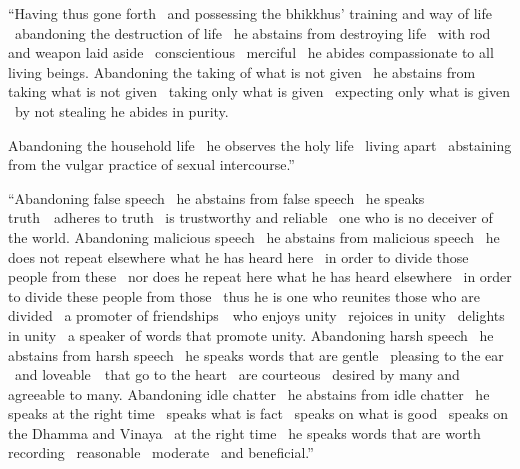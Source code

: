 \suttaRef{[MN 107]}

\begin{english-only-justify}
  ``Having thus gone forth \breathmark\ and possessing the bhikkhus' training and way of life \breathmark\ abandoning the destruction of life \breathmark\ he abstains from destroying life \breathmark\ with rod and weapon laid aside \breathmark\ conscientious \breathmark\ merciful \breathmark\ he abides compassionate to all living beings. Abandoning the taking of what is not given \breathmark\ he abstains from taking what is not given \breathmark\ taking only what is given \breathmark\ expecting only what is given \breathmark\ by not stealing he abides in purity.
\end{english-only-justify}

\begin{english-only-justify}
  Abandoning the household life \breathmark\ he observes the holy life \breathmark\ living apart \breathmark\ abstaining from the vulgar practice of sexual intercourse.''
\end{english-only-justify}

\begin{english-only-justify}
  ``Abandoning false speech \breathmark\ he abstains from false speech \breathmark\ he speaks \mbox{truth}~\breathmark\ adheres to truth \breathmark\ is trustworthy and reliable \breathmark\ one who is no deceiver of the world. Abandoning malicious speech \breathmark\ he abstains from malicious speech \breathmark\ he does not repeat elsewhere what he has heard here \breathmark\ in order to divide those people\makeatletter\hyperlink{endnote59-appendix}\makeatother
  from these \breathmark\ nor does he repeat here what he has heard elsewhere \breathmark\ in order to divide these people from those \breathmark\ thus he is one who reunites those who are divided \breathmark\ a promoter of \mbox{friendships}~\breathmark\ who enjoys unity \breathmark\ rejoices in unity \breathmark\ delights in unity \breathmark\ a speaker of words that promote unity. Abandoning harsh speech \breathmark\ he abstains from harsh speech \breathmark\ he speaks words that are gentle \breathmark\ pleasing to the ear \breathmark\ and \mbox{loveable}~\breathmark\ that go to the heart \breathmark\ are courteous \breathmark\ desired by many and agreeable to many. Abandoning idle chatter \breathmark\ he abstains from idle chatter \breathmark\ he speaks at the right time \breathmark\ speaks what is fact \breathmark\ speaks on what is good \breathmark\ speaks on the Dhamma and Vinaya \breathmark\ at the right time \breathmark\ he speaks words that are worth recording \breathmark\ reasonable \breathmark\ moderate \breathmark\ and beneficial.''
\end{english-only-justify}

